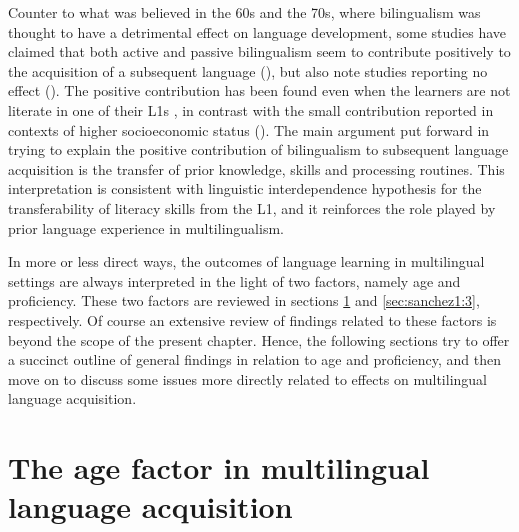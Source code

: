\documentclass[output=paper,colorlinks,citecolor=brown,nonflat]{../langscibook}
\begin{document}
Counter to what was believed in the 60s and the 70s, where bilingualism was thought to have a detrimental effect on language development, some studies have claimed that both active and passive bilingualism seem to contribute positively to the acquisition of a subsequent language (\citealt{CenozValencia1994, Muñoz2000, Sanz2000, Brohy2001}), but also note studies reporting no effect (\citealt{JaspaertLemmens1990, SandersMeijers1995}). The positive contribution has been found even when the learners are not literate in one of their L1s \citep{WagnerEtAl1989}, in contrast with the small contribution reported in contexts of higher socioeconomic status (\citealt{BenmamounEtAl2013, Polinsky2015}). The main argument put forward in trying to explain the positive contribution of bilingualism to subsequent language acquisition is the transfer of prior knowledge, skills and processing routines. This interpretation is consistent with  linguistic interdependence hypothesis for the transferability of literacy skills from the L1, and it reinforces the role played by prior language experience in multilingualism.

In more or less direct ways, the outcomes of language learning in multilingual settings are always interpreted in the light of two factors, namely age and proficiency. These two factors are reviewed in sections \ref{sec:sanchez1:2} and \ref{sec:sanchez1:3}, respectively. Of course an extensive review of findings related to these factors is beyond the scope of the present chapter. Hence, the following sections try to offer a succinct outline of general findings in relation to age and proficiency, and then move on to discuss some issues more directly related to effects on multilingual language acquisition.

\section{The age factor in multilingual language acquisition}\label{sec:sanchez1:2}
\end{document}
